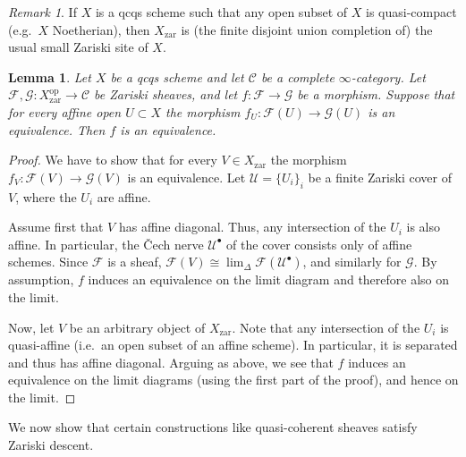 \documentclass{article}
\theoremstyle{definition}
\theoremstyle{definition}
\theoremstyle{definition}
\theoremstyle{plain}
\newtheorem{lem}[defn]{Lemma}
\theoremstyle{plain}
\theoremstyle{plain}
\theoremstyle{plain}
\theoremstyle{plain}
\theoremstyle{plain}
\theoremstyle{plain}
\theoremstyle{plain}
\theoremstyle{remark}
\newtheorem{rmk}[defn]{Remark}
\theoremstyle{remark}
\theoremstyle{plain}
\theoremstyle{plain}
\theoremstyle{plain}
\theoremstyle{plain}
\theoremstyle{plain}
\newcommand{\op}[1]{#1^{\operatorname{op}}}
\renewcommand{\lim}{\operatorname{lim}}
\newcommand{\Cat}[1]{\mathcal{#1}}
\newcommand{\zar}{\operatorname{zar}}
\begin{document}
\begin{rmk}
    If $X$ is a qcqs scheme such that any open subset of $X$ is quasi-compact 
    (e.g.\ $X$ Noetherian), then $X_{\zar}$ is 
    (the finite disjoint union completion of) the usual small Zariski site of $X$.
\end{rmk}

\begin{lem} \label{lem:zariski:check-on-affines}
    Let $X$ be a qcqs scheme and let $\Cat C$ be a complete $\infty$-category.
    Let $\Cat F, \Cat G \colon \op X_{\zar} \to \Cat C$ be Zariski sheaves,
    and let $f \colon \Cat F \to \Cat G$ be a morphism.
    Suppose that for every affine open $U \subset X$ 
    the morphism $f_U \colon \Cat F(U) \to \Cat G(U)$ is an equivalence.
    Then $f$ is an equivalence.
\end{lem}
\begin{proof}
    We have to show that for every $V \in X_{\zar}$ the morphism $f_V \colon \Cat F(V) \to \Cat G(V)$ 
    is an equivalence. Let $\Cat U = \{U_i\}_i$ be a finite Zariski cover of $V$, where the $U_i$ are affine.
    
    Assume first that $V$ has affine diagonal. Thus, any intersection of the $U_i$ 
    is also affine.
    In particular, the \v{C}ech nerve $\Cat U^\bullet$ of the cover consists only of affine schemes.
    Since $\Cat F$ is a sheaf, $\Cat F(V) \cong \lim_{\Delta} \Cat F(\Cat U^\bullet)$,
    and similarly for $\Cat G$.
    By assumption, $f$ induces an equivalence
    on the limit diagram and therefore also on the limit.

    Now, let $V$ be an arbitrary object of $X_{\zar}$. Note that any intersection of the $U_i$ 
    is quasi-affine (i.e.\ an open subset of an affine scheme). In particular, it is separated 
    and thus has affine diagonal. Arguing as above, we see that $f$ induces an equivalence 
    on the limit diagrams (using the first part of the proof), and hence on the limit.
\end{proof}

We now show that certain constructions like quasi-coherent sheaves satisfy Zariski descent.
\end{document}
